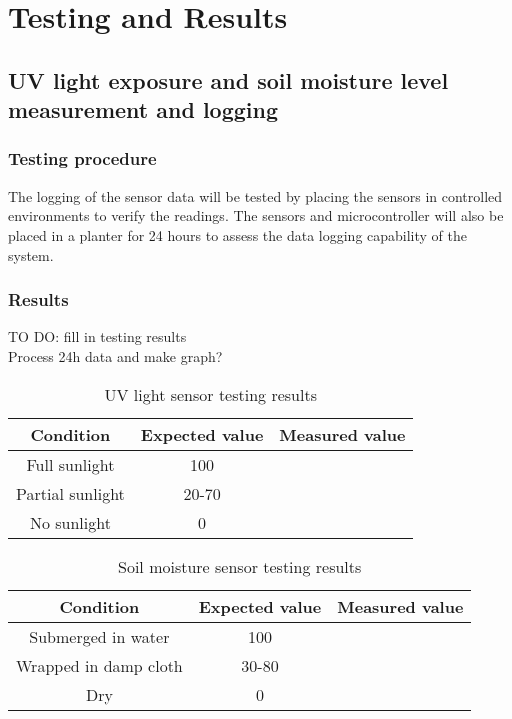 \graphicspath{{testing/fig/}}

\chapter{Testing and Results}
\label{chap:testing}

\section{UV light exposure and soil moisture level measurement and
logging}

\subsection{Testing procedure}
The logging of the sensor data will be tested by placing the sensors in controlled environments to verify the readings. The sensors and microcontroller will also be placed in a planter for 24 hours to assess the data logging capability of the system.

\subsection{Results}
TO DO: fill in testing results \\
Process 24h data and make graph?

\begin{table}[!h]
    \centering
    \begin{tabular}{|c|c|c|}
        \hline
        Condition & Expected value & Measured value \\
        \hline
        Full sunlight & 100 & \\
        Partial sunlight & 20-70 & \\
        No sunlight & 0 & \\
        \hline
    \end{tabular}
    \caption{UV light sensor testing results}
    \label{tab:uv_results}
\end{table}

\begin{table}[!h]
    \centering
    \begin{tabular}{|c|c|c|}
        \hline
        Condition & Expected value & Measured value \\
        \hline
        Submerged in water & 100 & \\
        Wrapped in damp cloth & 30-80 & \\
        Dry & 0 & \\
        \hline
    \end{tabular}
    \caption{Soil moisture sensor testing results}
    \label{tab:soil_results}
\end{table}

